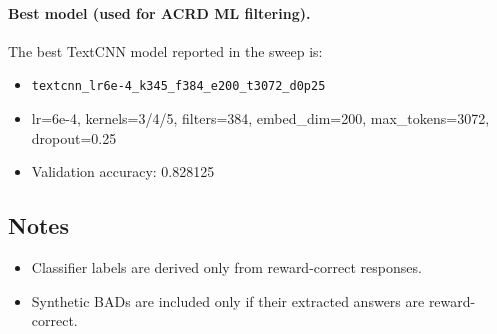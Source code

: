 \paragraph{Best model (used for ACRD ML filtering).}
The best TextCNN model reported in the sweep is:
\begin{itemize}
  \item \texttt{textcnn\_lr6e-4\_k345\_f384\_e200\_t3072\_d0p25}
  \item lr=6e-4, kernels=3/4/5, filters=384, embed\_dim=200,
        max\_tokens=3072, dropout=0.25
  \item Validation accuracy: 0.828125
\end{itemize}

\subsection{Notes}
\label{subsec:textcnn-notes}

\begin{itemize}
  \item Classifier labels are derived only from reward-correct responses.
  \item Synthetic BADs are included only if their extracted answers are reward-correct.
\end{itemize}

